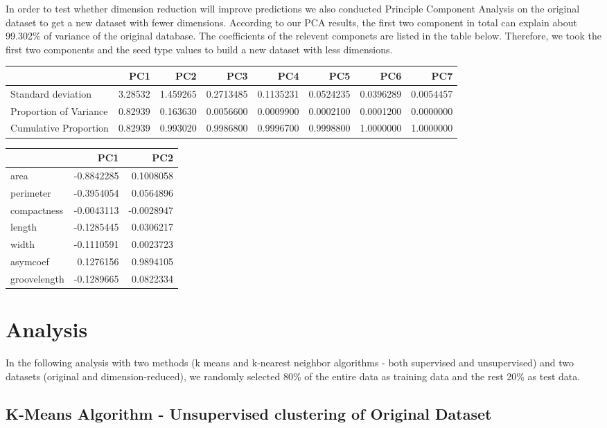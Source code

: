 \documentclass[]{article}
\begin{document}
In order to test whether dimension reduction will improve predictions we
also conducted Principle Component Analysis on the original dataset to
get a new dataset with fewer dimensions. According to our PCA results,
the first two component in total can explain about 99.302\% of variance
of the original database. The coefficients of the relevent componets are
listed in the table below. Therefore, we took the first two components
and the seed type values to build a new dataset with less dimensions.

\begin{longtable}[]{@{}lrrrrrrr@{}}
\toprule
& PC1 & PC2 & PC3 & PC4 & PC5 & PC6 & PC7\tabularnewline
\midrule
\endhead
Standard deviation & 3.28532 & 1.459265 & 0.2713485 & 0.1135231 &
0.0524235 & 0.0396289 & 0.0054457\tabularnewline
Proportion of Variance & 0.82939 & 0.163630 & 0.0056600 & 0.0009900 &
0.0002100 & 0.0001200 & 0.0000000\tabularnewline
Cumulative Proportion & 0.82939 & 0.993020 & 0.9986800 & 0.9996700 &
0.9998800 & 1.0000000 & 1.0000000\tabularnewline
\bottomrule
\end{longtable}

\begin{longtable}[]{@{}lrr@{}}
\toprule
& PC1 & PC2\tabularnewline
\midrule
\endhead
area & -0.8842285 & 0.1008058\tabularnewline
perimeter & -0.3954054 & 0.0564896\tabularnewline
compactness & -0.0043113 & -0.0028947\tabularnewline
length & -0.1285445 & 0.0306217\tabularnewline
width & -0.1110591 & 0.0023723\tabularnewline
asymcoef & 0.1276156 & 0.9894105\tabularnewline
groovelength & -0.1289665 & 0.0822334\tabularnewline
\bottomrule
\end{longtable}

\section{Analysis}\label{analysis}

In the following analysis with two methods (k means and k-nearest
neighbor algorithms - both supervised and unsupervised) and two datasets
(original and dimension-reduced), we randomly selected 80\% of the
entire data as training data and the rest 20\% as test data.

\subsection{K-Means Algorithm - Unsupervised clustering of Original
Dataset}\label{k-means-algorithm---unsupervised-clustering-of-original-dataset}
\end{document}
